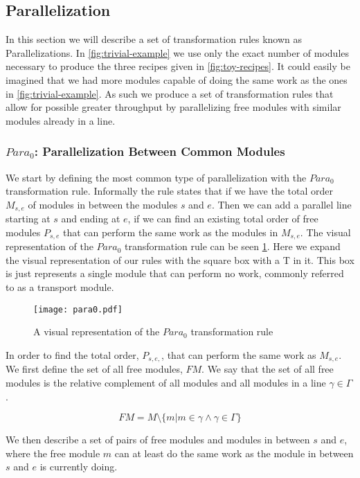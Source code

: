 \subsection{Parallelization}
In this section we will describe a set of transformation rules known as Parallelizations. In \cref{fig:trivial-example} we use only the exact number of modules necessary to produce the three recipes given in \cref{fig:toy-recipes}. It could easily be imagined that we had more modules capable of doing the same work as the ones in \cref{fig:trivial-example}. As such we produce a set of transformation rules that allow for possible greater throughput by parallelizing free modules with similar modules already in a line.


\subsubsection{$Para_0$: Parallelization Between Common Modules}
We start by defining the most common type of parallelization with the $Para_0$ transformation rule. Informally the rule states that if we have the total order $M_{s,e}$ of modules in between the modules $s$ and $e$. Then we can add a parallel line starting at $s$ and ending at $e$, if we can find an existing total order of free modules $P_{s,e}$ that can perform the same work as the modules in $M_{s,e}$. The visual representation of the $Para_0$ transformation rule can be seen \cref{fig:para0}. Here we expand the visual representation of our rules with the square box with a T in it. This box is just represents a single module that can perform no work, commonly referred to as a transport module.

\begin{figure}[H]
	\centering
	\texttt{[image: para0.pdf]}
	\caption{A visual representation of the $Para_0$ transformation rule}
	\label{fig:para0}
\end{figure}

In order to find the total order, $P_{s,e,}$, that can perform the same work as $M_{s,e}$. We first define the set of all free modules, $FM$. We say that the set of all free modules is the relative complement of all modules and all modules in a line $\gamma \in \Gamma$.

\[FM = M \setminus \{m | m \in \gamma \land \gamma \in \Gamma\}\]

We then describe a set of pairs of free modules and modules in between $s$ and $e$, where the free module $m$ can at least do the same work as the module in between $s$ and $e$ is currently doing.

